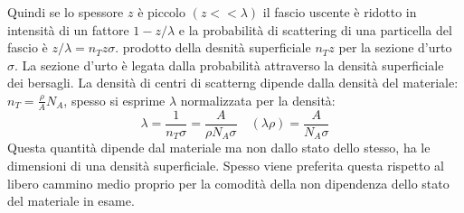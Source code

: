 Quindi se lo spessore $z$ è piccolo $(z<<\lambda)$ il fascio uscente è ridotto in intensità di un fattore $1-z/\lambda$ e la probabilità di scattering di una particella del fascio è $z/\lambda=n_Tz\sigma$. prodotto della desnità superficiale $n_Tz$ per la sezione d'urto $\sigma$. La sezione d'urto è legata dalla probabilità attraverso la densità superficiale dei bersagli. La densità di centri di scatterng dipende dalla densità del materiale: $n_T=\frac{\rho}{A}N_A$, spesso si esprime $\lambda$ normalizzata per la densità:
\begin{equation*}
    \lambda=\frac{1}{n_T\sigma}=\frac{A}{\rho N_A\sigma} \quad (\lambda\rho)=\frac{A}{N_A\sigma}
\end{equation*}
Questa quantità dipende dal materiale ma non dallo stato dello stesso, ha le dimensioni di una densità superficiale. Spesso viene preferita questa rispetto al libero cammino medio proprio per la comodità della non dipendenza dello stato del materiale in esame.
